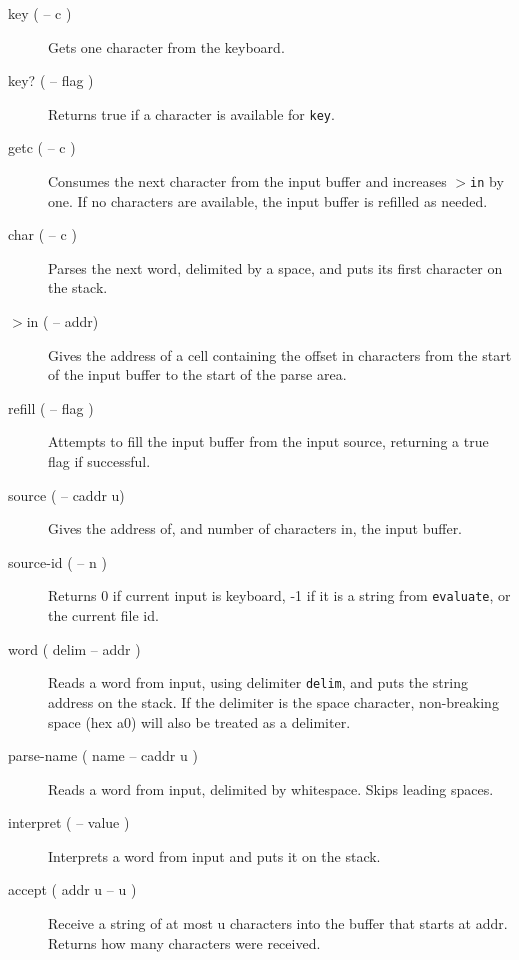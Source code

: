 \begin{description}

\item[key ( -- c )] Gets one character from the keyboard.
\item[key? ( -- flag )] Returns true if a character is available for \texttt{key}.
\item[getc ( -- c )] Consumes the next character from the input buffer and increases \texttt{$>$in} by one. If no characters are available, the input buffer is refilled as needed.

\item[char ( -- c )] Parses the next word, delimited by a space, and puts its first character on the stack.

\item[$>$in ( -- addr)] Gives the address of a cell containing the offset in characters from the start of the input buffer to the start of the parse area.

\item[refill ( -- flag )] Attempts to fill the input buffer from the input source, returning a true flag if successful.

\item[source ( -- caddr u)] Gives the address of, and number of characters in, the input buffer.
\item[source-id ( -- n )] Returns 0 if current input is keyboard, -1 if it is a string from \texttt{evaluate}, or the current file id.

\item[word ( delim -- addr )] Reads a word from input, using delimiter \texttt{delim}, and puts the string address on the stack. If the delimiter is the space character, non-breaking space (hex a0) will also be treated as a delimiter.

\item[parse-name ( name -- caddr u )] Reads a word from input, delimited by whitespace. Skips leading spaces.

\item[interpret ( -- value )] Interprets a word from input and puts it on the stack.

\item[accept ( addr u -- u )] Receive a string of at most u characters into the buffer that starts at addr. Returns how many characters were received.


\end{description}
